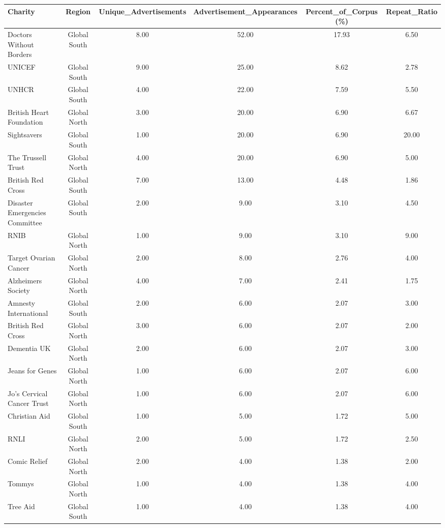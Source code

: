 \begin{table}[ht]
\centering
\begin{tabular}{p{5cm}ccccc}
  \hline
Charity & Region & Unique\_Advertisements & Advertisement\_Appearances & Percent\_of\_Corpus (\%) & Repeat\_Ratio \\ 
  \hline
Doctors Without Borders & Global South & 8.00 & 52.00 & 17.93 & 6.50 \\ 
  UNICEF & Global South & 9.00 & 25.00 & 8.62 & 2.78 \\ 
  UNHCR & Global South & 4.00 & 22.00 & 7.59 & 5.50 \\ 
  British Heart Foundation & Global North & 3.00 & 20.00 & 6.90 & 6.67 \\ 
  Sightsavers & Global South & 1.00 & 20.00 & 6.90 & 20.00 \\ 
  The Trussell Trust & Global North & 4.00 & 20.00 & 6.90 & 5.00 \\ 
  British Red Cross & Global South & 7.00 & 13.00 & 4.48 & 1.86 \\ 
  Disaster Emergencies Committee & Global South & 2.00 & 9.00 & 3.10 & 4.50 \\ 
  RNIB & Global North & 1.00 & 9.00 & 3.10 & 9.00 \\ 
  Target Ovarian Cancer & Global North & 2.00 & 8.00 & 2.76 & 4.00 \\ 
  Alzheimers Society & Global North & 4.00 & 7.00 & 2.41 & 1.75 \\ 
  Amnesty International & Global South & 2.00 & 6.00 & 2.07 & 3.00 \\ 
  British Red Cross & Global North & 3.00 & 6.00 & 2.07 & 2.00 \\ 
  Dementia UK & Global North & 2.00 & 6.00 & 2.07 & 3.00 \\ 
  Jeans for Genes & Global North & 1.00 & 6.00 & 2.07 & 6.00 \\ 
  Jo's Cervical Cancer Trust & Global North & 1.00 & 6.00 & 2.07 & 6.00 \\ 
  Christian Aid & Global South & 1.00 & 5.00 & 1.72 & 5.00 \\ 
  RNLI & Global North & 2.00 & 5.00 & 1.72 & 2.50 \\ 
  Comic Relief & Global North & 2.00 & 4.00 & 1.38 & 2.00 \\ 
  Tommys & Global North & 1.00 & 4.00 & 1.38 & 4.00 \\ 
  Tree Aid & Global South & 1.00 & 4.00 & 1.38 & 4.00 \\ 

\end{tabular}
\end{table}
